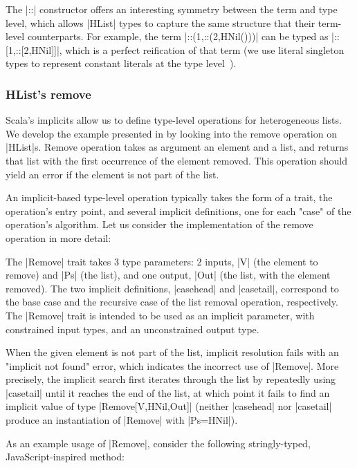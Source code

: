 \noindent
The |::| constructor offers an interesting symmetry between the term and type level, which allows |HList| types to capture the same structure that their term-level counterparts.
For example, the term |::(1,::(2,HNil()))| can be typed as |::[1,::[2,HNil]]|, which is a perfect reification of that term (we use literal singleton types to represent constant literals at the type level~\citep{leontiev2014sip}).

\subsubsection{HList's remove}
\label{sec:hlists-remove}

Scala's implicits allow us to define type-level operations for heterogeneous lists.
We develop the example presented in  by looking into the remove operation on |HList|s.
Remove operation takes as argument an element and a list, and returns that list with the first occurrence of the element removed.
This operation should yield an error if the element is not part of the list.

An implicit-based type-level operation typically takes the form of a trait, the operation's entry point, and several implicit definitions, one for each "case" of the operation's algorithm.
Let us consider the implementation of the remove operation in more detail:

\memImplicitRemove

\noindent
The |Remove| trait takes 3 type parameters: 2 inputs, |V| (the element to remove) and |Ps| (the list), and one output, |Out| (the list, with the element removed).
The two implicit definitions, |casehead| and |casetail|, correspond to the base case and the recursive case of the list removal operation, respectively.
The |Remove| trait is intended to be used as an implicit parameter, with constrained input types, and an unconstrained output type.

When the given element is not part of the list, implicit resolution fails with an "implicit not found" error, which indicates the incorrect use of |Remove|.
More precisely, the implicit search first iterates through the list by repeatedly using |casetail| until it reaches the end of the list, at which point it fails to find an implicit value of type |Remove[V,HNil,Out]| (neither |casehead| nor |casetail| produce an instantiation of |Remove| with |Ps=HNil|).

As an example usage of |Remove|, consider the following stringly-typed, JavaScript-inspired method:

